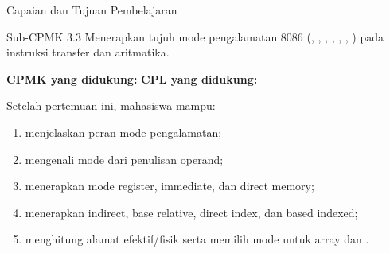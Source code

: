 \documentclass[aspectratio=169,11pt]{beamer}
\begin{document}

\begin{frame}{Capaian dan Tujuan Pembelajaran}
\begin{block}{Sub-CPMK 3.3}
\footnotesize Menerapkan tujuh mode pengalamatan 8086
(, , ,
, , ,
) pada instruksi transfer dan aritmatika.
\end{block}

\vspace{0.1em}
{\small\textbf{CPMK yang didukung:} \quad\textbullet\quad
\textbf{CPL yang didukung:} \par}

\vspace{0.15em}
\begin{exampleblock}{Setelah pertemuan ini, mahasiswa mampu:}
\footnotesize
\begin{enumerate}
    \item menjelaskan peran mode pengalamatan;
    \item mengenali mode dari penulisan operand;
    \item menerapkan mode register, immediate, dan direct memory;
    \item menerapkan indirect, base relative, direct index, dan
          based indexed;
    \item menghitung alamat efektif/fisik serta memilih mode untuk
          array dan .
\end{enumerate}
\end{exampleblock}
\end{frame}
\end{document}
